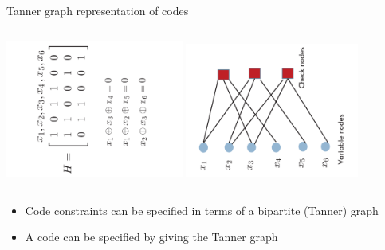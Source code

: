 \documentclass[10pt,xcolor=table]{beamer}
\begin{document}
\begin{frame}{Tanner graph representation of codes}
\begin{columns}
\includegraphics[width=2.3in,angle=-90]{./Figures/paritycheckmatrix63code}
\includegraphics[width=2.25in,angle=-90]{./Figures/Tannergraph63code}
\end{columns}
\begin{block}{}
\begin{itemize}
  \item Code constraints can be specified in terms of a bipartite (Tanner) graph
  \item A code can be specified by giving the Tanner graph
\end{itemize}
\end{block}
\end{frame}
\end{document}
